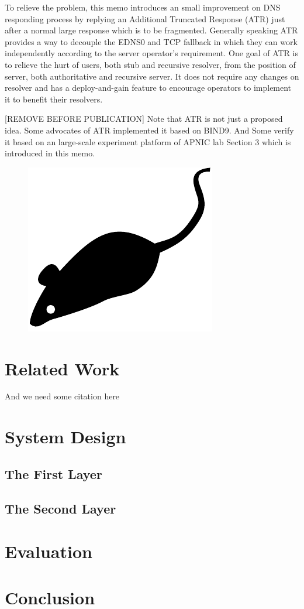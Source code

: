    To relieve the problem, this memo introduces an small improvement on
   DNS responding process by replying an Additional Truncated Response
   (ATR) just after a normal large response which is to be fragmented.
   Generally speaking ATR provides a way to decouple the EDNS0 and TCP
   fallback in which they can work independently according to the server
   operator's requirement.  One goal of ATR is to relieve the hurt of
   users, both stub and recursive resolver, from the position of server,
   both authoritative and recursive server.  It does not require any
   changes on resolver and has a deploy-and-gain feature to encourage
   operators to implement it to benefit their resolvers.

   [REMOVE BEFORE PUBLICATION] Note that ATR is not just a proposed
   idea.  Some advocates of ATR implemented it based on BIND9.  And
   Some verify it based on an large-scale experiment platform of APNIC
   lab Section 3 which is introduced in this memo.

\begin{figure}[tp]
\centering
\includegraphics{figures/mouse}
\caption{\blindtext}
\end{figure}

\section{Related Work}
\blindtext

And we need some citation here\cite{floyd1993random, stoica2001chord}

\Blindtext

\section{System Design}

\subsection{The First Layer}
\Blindtext

\subsection{The Second Layer}
\Blindtext

\section{Evaluation}
\Blindtext

\section{Conclusion}
\blindtext

